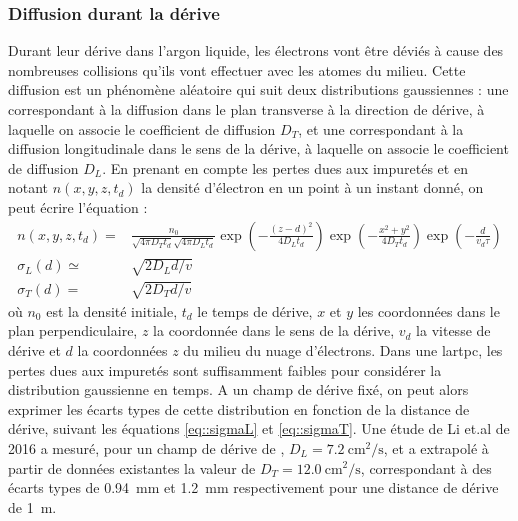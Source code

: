       \subsubsection{Diffusion durant la dérive}\label{sec::diffusion}

        Durant leur dérive dans l'argon liquide, les électrons vont être déviés à cause des nombreuses collisions qu'ils vont effectuer avec les atomes du milieu. Cette diffusion est un phénomène aléatoire qui suit deux distributions gaussiennes : une correspondant à la diffusion dans le plan transverse à la direction de dérive, à laquelle on associe le coefficient de diffusion $D_T$, et une correspondant à la diffusion longitudinale dans le sens de la dérive, à laquelle on associe le coefficient de diffusion $D_L$. En prenant en compte les pertes dues aux impuretés et en notant $n(x,y,z,t_d)$ la densité d'électron en un point à un instant donné, on peut écrire l'équation : 
        \begin{eqnarray}
          n(x,y,z,t_d) = & \frac{n_0}{\sqrt{4\pi D_T t_d}\sqrt{4\pi D_L t_d}}\exp\left(-\frac{(z-d)^2}{4D_L t_d}\right)\exp\left(-\frac{x^2+y^2}{4D_T t_d}\right)\exp\left(-\frac{d}{v_d\tau}\right) \label{eq::diffusion} \\
          \sigma_L(d) \simeq & \sqrt{2 D_L d/v} \label{eq::sigmaL} \\
          \sigma_T(d) = & \sqrt{2 D_T d/v} \label{eq::sigmaT}
        \end{eqnarray}
        où $n_0$ est la densité initiale, $t_d$ le temps de dérive, $x$ et $y$ les coordonnées dans le plan perpendiculaire, $z$ la coordonnée dans le sens de la dérive, $v_d$ la vitesse de dérive et $d$ la coordonnées $z$ du milieu du nuage d'électrons. Dans une \gls{lartpc}, les pertes dues aux impuretés sont suffisamment faibles pour considérer la distribution gaussienne en temps. A un champ de dérive fixé, on peut alors exprimer les écarts types de cette distribution en fonction de la distance de dérive, suivant les équations \eqref{eq::sigmaL} et \eqref{eq::sigmaT}. Une étude de Li et.al de 2016\cite{Li2015} a mesuré, pour un champ de dérive de \driftfield{}, $D_L=\SI{7.2}{\centi\meter\squared\per\second}$, et a extrapolé à partir de données existantes la valeur de $D_T=\SI{12.0}{\centi\meter\squared\per\second}$, correspondant à des écarts types de \SI{0.94}{\milli\meter} et \SI{1.2}{\milli\meter} respectivement pour une distance de dérive de \SI{1}{\meter}. %

    


\FloatBarrier

\printbibliography